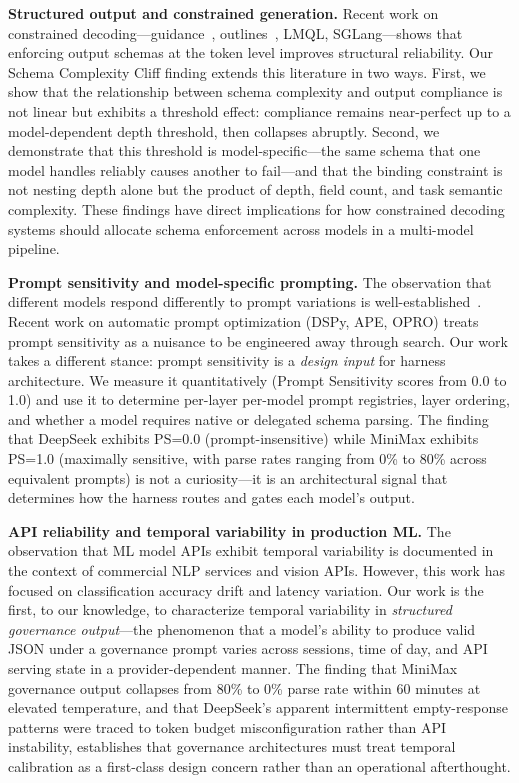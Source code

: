 \documentclass[11pt,a4paper]{article}
\begin{document}
\textbf{Structured output and constrained generation.} Recent work on constrained decoding---guidance~\cite{guidance}, outlines~\cite{willard2023}, LMQL, SGLang---shows that enforcing output schemas at the token level improves structural reliability. Our Schema Complexity Cliff finding extends this literature in two ways. First, we show that the relationship between schema complexity and output compliance is not linear but exhibits a threshold effect: compliance remains near-perfect up to a model-dependent depth threshold, then collapses abruptly. Second, we demonstrate that this threshold is model-specific---the same schema that one model handles reliably causes another to fail---and that the binding constraint is not nesting depth alone but the product of depth, field count, and task semantic complexity. These findings have direct implications for how constrained decoding systems should allocate schema enforcement across models in a multi-model pipeline.

\textbf{Prompt sensitivity and model-specific prompting.} The observation that different models respond differently to prompt variations is well-established~\cite{zhou2023large, white2023prompt}. Recent work on automatic prompt optimization (DSPy, APE, OPRO) treats prompt sensitivity as a nuisance to be engineered away through search. Our work takes a different stance: prompt sensitivity is a \textit{design input} for harness architecture. We measure it quantitatively (Prompt Sensitivity scores from 0.0 to 1.0) and use it to determine per-layer per-model prompt registries, layer ordering, and whether a model requires native or delegated schema parsing. The finding that DeepSeek exhibits PS=0.0 (prompt-insensitive) while MiniMax exhibits PS=1.0 (maximally sensitive, with parse rates ranging from 0\% to 80\% across equivalent prompts) is not a curiosity---it is an architectural signal that determines how the harness routes and gates each model's output.

\textbf{API reliability and temporal variability in production ML.} The observation that ML model APIs exhibit temporal variability is documented in the context of commercial NLP services and vision APIs. However, this work has focused on classification accuracy drift and latency variation. Our work is the first, to our knowledge, to characterize temporal variability in \textit{structured governance output}---the phenomenon that a model's ability to produce valid JSON under a governance prompt varies across sessions, time of day, and API serving state in a provider-dependent manner. The finding that MiniMax governance output collapses from 80\% to 0\% parse rate within 60 minutes at elevated temperature, and that DeepSeek's apparent intermittent empty-response patterns were traced to token budget misconfiguration rather than API instability, establishes that governance architectures must treat temporal calibration as a first-class design concern rather than an operational afterthought.
\end{document}
